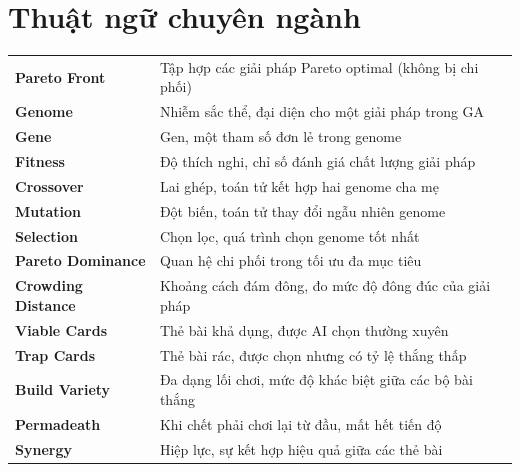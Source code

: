 \section*{Thuật ngữ chuyên ngành}
\begin{tabularx}{\textwidth}{l X}
    \textbf{Pareto Front} & Tập hợp các giải pháp Pareto optimal (không bị chi phối) \\
    \textbf{Genome} & Nhiễm sắc thể, đại diện cho một giải pháp trong GA \\
    \textbf{Gene} & Gen, một tham số đơn lẻ trong genome \\
    \textbf{Fitness} & Độ thích nghi, chỉ số đánh giá chất lượng giải pháp \\
    \textbf{Crossover} & Lai ghép, toán tử kết hợp hai genome cha mẹ \\
    \textbf{Mutation} & Đột biến, toán tử thay đổi ngẫu nhiên genome \\
    \textbf{Selection} & Chọn lọc, quá trình chọn genome tốt nhất \\
    \textbf{Pareto Dominance} & Quan hệ chi phối trong tối ưu đa mục tiêu \\
    \textbf{Crowding Distance} & Khoảng cách đám đông, đo mức độ đông đúc của giải pháp \\
    \textbf{Viable Cards} & Thẻ bài khả dụng, được AI chọn thường xuyên \\
    \textbf{Trap Cards} & Thẻ bài rác, được chọn nhưng có tỷ lệ thắng thấp \\
    \textbf{Build Variety} & Đa dạng lối chơi, mức độ khác biệt giữa các bộ bài thắng \\
    \textbf{Permadeath} & Khi chết phải chơi lại từ đầu, mất hết tiến độ \\
    \textbf{Synergy} & Hiệp lực, sự kết hợp hiệu quả giữa các thẻ bài \\
\end{tabularx}
